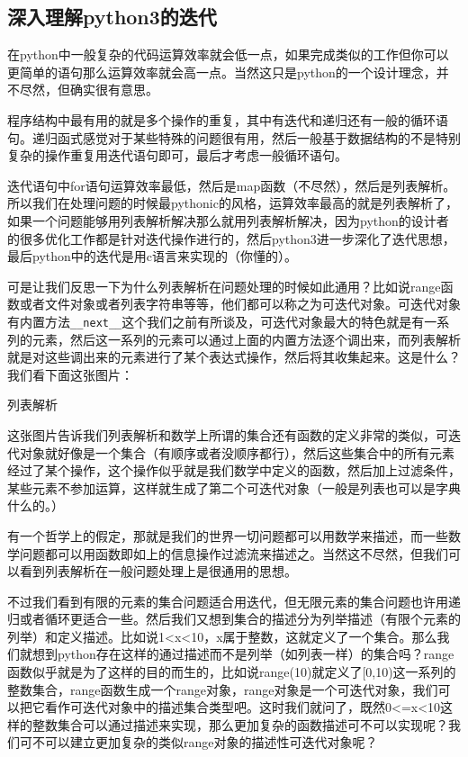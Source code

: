 \documentclass[12pt,oneside]{book}
\begin{document}
\begin{common-format}
\chapter{深入理解python3的迭代}
\label{sec:深入理解python3的迭代}
在python中一般复杂的代码运算效率就会低一点，如果完成类似的工作但你可以更简单的语句那么运算效率就会高一点。当然这只是python的一个设计理念，并不尽然，但确实很有意思。

程序结构中最有用的就是多个操作的重复，其中有迭代和递归还有一般的循环语句。递归函式感觉对于某些特殊的问题很有用，然后一般基于数据结构的不是特别复杂的操作重复用迭代语句即可，最后才考虑一般循环语句。

迭代语句中for语句运算效率最低，然后是map函数（不尽然），然后是列表解析。所以我们在处理问题的时候最pythonic的风格，运算效率最高的就是列表解析了，如果一个问题能够用列表解析解决那么就用列表解析解决，因为python的设计者的很多优化工作都是针对迭代操作进行的，然后python3进一步深化了迭代思想，最后python中的迭代是用c语言来实现的（你懂的）。

可是让我们反思一下为什么列表解析在问题处理的时候如此通用？比如说range函数或者文件对象或者列表字符串等等，他们都可以称之为可迭代对象。可迭代对象有内置方法\verb+__next__+这个我们之前有所谈及，可迭代对象最大的特色就是有一系列的元素，然后这一系列的元素可以通过上面的内置方法逐个调出来，而列表解析就是对这些调出来的元素进行了某个表达式操作，然后将其收集起来。这是什么？我们看下面这张图片：
\begin{fig}{列表解析}
\caption{列表解析}
\label{fig:列表解析}
\end{fig}

这张图片告诉我们列表解析和数学上所谓的集合还有函数的定义非常的类似，可迭代对象就好像是一个集合（有顺序或者没顺序都行），然后这些集合中的所有元素经过了某个操作，这个操作似乎就是我们数学中定义的函数，然后加上过滤条件，某些元素不参加运算，这样就生成了第二个可迭代对象（一般是列表也可以是字典什么的。）

有一个哲学上的假定，那就是我们的世界一切问题都可以用数学来描述，而一些数学问题都可以用函数即如上的信息操作过滤流来描述之。当然这不尽然，但我们可以看到列表解析在一般问题处理上是很通用的思想。

不过我们看到有限的元素的集合问题适合用迭代，但无限元素的集合问题也许用递归或者循环更适合一些。然后我们又想到集合的描述分为列举描述（有限个元素的列举）和定义描述。比如说1<x<10，x属于整数，这就定义了一个集合。那么我们就想到python存在这样的通过描述而不是列举（如列表一样）的集合吗？range函数似乎就是为了这样的目的而生的，比如说range(10)就定义了[0,10)这一系列的整数集合，range函数生成一个range对象，range对象是一个可迭代对象，我们可以把它看作可迭代对象中的描述集合类型吧。这时我们就问了，既然0<=x<10这样的整数集合可以通过描述来实现，那么更加复杂的函数描述可不可以实现呢？我们可不可以建立更加复杂的类似range对象的描述性可迭代对象呢？


\end{common-format}
\end{document}
